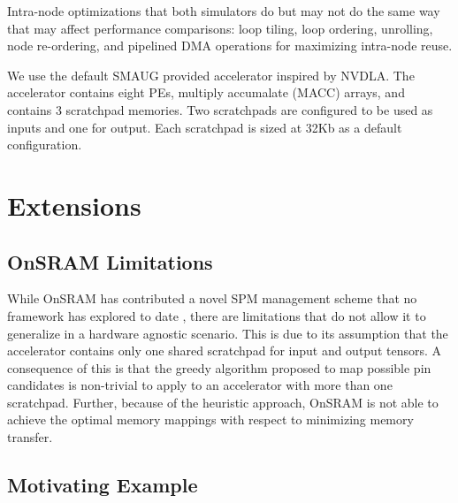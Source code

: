 Intra-node optimizations that both simulators do but may not do the same way
that may affect performance comparisons: loop tiling, loop ordering, unrolling,
node re-ordering, and pipelined DMA operations for maximizing intra-node reuse.

We use the default SMAUG provided accelerator inspired by NVDLA\cite{smaug}.
The accelerator contains eight PEs, multiply accumalate (MACC) arrays, and
contains 3 scratchpad memories\cite{smaug}. Two scratchpads are configured to
be used as inputs and one for output. Each scratchpad is sized at 32Kb as a default
configuration.


\section{Extensions}


\subsection{OnSRAM Limitations}

While OnSRAM has contributed a novel SPM management scheme that no framework
has explored to date \cite{onsram}, there are limitations that do not allow it to
generalize in a hardware agnostic scenario. This is due to its assumption that
the accelerator contains only one shared scratchpad for input and output
tensors. A consequence of this is that the greedy algorithm proposed to map
possible pin candidates is non-trivial to apply to an accelerator with more
than one scratchpad. Further, because of the heuristic approach, OnSRAM is not
able to achieve the optimal memory mappings with respect to minimizing memory
transfer.


\subsection{Motivating Example}


